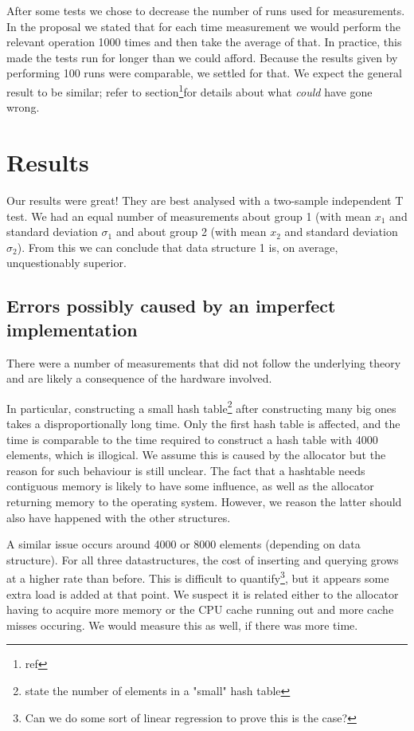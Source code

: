 \documentclass[12pt,a4paper]{article}
\begin{document}
    After some tests we chose to decrease the number of runs used for measurements.  In the proposal
    we stated that for each time measurement we would perform the relevant operation 1000 times and
    then take the average of that.  In practice, this made the tests run for longer than we could
    afford. Because the results given by performing 100 runs were comparable, we settled for that.
    We expect the general result to be similar; refer to section\footnote{ref}for details about what
    \emph{could} have gone wrong.


    \section{Results}

    Our results were great!  They are best analysed with a two-sample independent T test.  We had an
    equal number of measurements about group 1 (with mean $x_1$ and standard deviation $\sigma_1$ and
    about group 2 (with mean $x_2$ and standard deviation $\sigma_2$).  From this we can conclude that
    data structure 1 is, on average, unquestionably superior.

    \subsection{Errors possibly caused by an imperfect implementation}

    There were a number of measurements that did not follow the underlying theory and are likely a
    consequence of the hardware involved.

    In particular, constructing a small hash table\footnote{state the number of elements in a
    "small" hash table} after constructing many big ones takes a disproportionally long time.  Only
    the first hash table is affected, and the time is comparable to the time required to construct a
    hash table with 4000 elements, which is illogical.  We assume this is caused by the allocator
    but the reason for such behaviour is still unclear.  The fact that a hashtable needs contiguous
    memory is likely to have some influence, as well as the allocator returning memory to the
    operating system.  However, we reason the latter should also have happened with the other
    structures.

    A similar issue occurs around 4000 or 8000 elements (depending on data structure).  For all
    three datastructures, the cost of inserting and querying grows at a higher rate than before.
    This is difficult to quantify\footnote{Can we do some sort of linear regression to prove this is
    the case?}, but it appears some extra load is added at that point.  We suspect it is related
    either to the allocator having to acquire more memory or the CPU cache running out and more
    cache misses occuring.  We would measure this as well, if there was more time.
\end{document}

